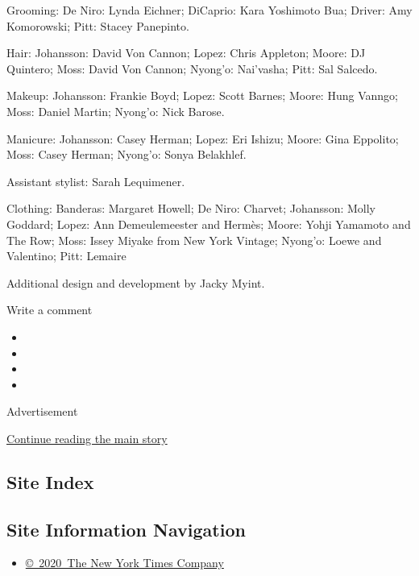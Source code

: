 Grooming: De Niro: Lynda Eichner; DiCaprio: Kara Yoshimoto Bua; Driver:
Amy Komorowski; Pitt: Stacey Panepinto.

Hair: Johansson: David Von Cannon; Lopez: Chris Appleton; Moore: DJ
Quintero; Moss: David Von Cannon; Nyong'o: Nai'vasha; Pitt: Sal Salcedo.

Makeup: Johansson: Frankie Boyd; Lopez: Scott Barnes; Moore: Hung
Vanngo; Moss: Daniel Martin; Nyong'o: Nick Barose.

Manicure: Johansson: Casey Herman; Lopez: Eri Ishizu; Moore: Gina
Eppolito; Moss: Casey Herman; Nyong'o: Sonya Belakhlef.

Assistant stylist: Sarah Lequimener.

Clothing: Banderas: Margaret Howell; De Niro: Charvet; Johansson: Molly
Goddard; Lopez: Ann Demeulemeester and Hermès; Moore: Yohji Yamamoto and
The Row; Moss: Issey Miyake from New York Vintage; Nyong'o: Loewe and
Valentino; Pitt: Lemaire

Additional design and development by Jacky Myint.

Write a comment

\begin{itemize}
\item
\item
\item
\item
\end{itemize}

Advertisement

\protect\hyperlink{after-bottom}{Continue reading the main story}

\hypertarget{site-index}{%
\subsection{Site Index}\label{site-index}}

\hypertarget{site-information-navigation}{%
\subsection{Site Information
Navigation}\label{site-information-navigation}}

\begin{itemize}
\tightlist
\item
  \href{https://help.nytimes3xbfgragh.onion/hc/en-us/articles/115014792127-Copyright-notice}{©~2020~The
  New York Times Company}
\end{itemize}

